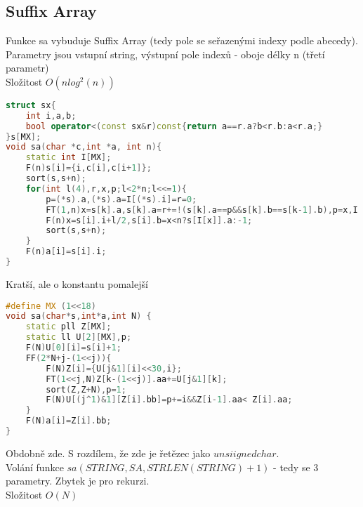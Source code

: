 \documentclass[11pt]{article}
\begin{document}
\subsection{Suffix Array}
Funkce sa vybuduje Suffix Array (tedy pole se seřazenými indexy podle abecedy).
\\Parametry jsou vstupní string, výstupní pole indexů - oboje délky \textsf{n} (třetí parametr)
\\Složitost $O(nlog^2(n))$
\begin{lstlisting}[language=C++]
struct sx{
    int i,a,b;
    bool operator<(const sx&r)const{return a==r.a?b<r.b:a<r.a;}
}s[MX];
void sa(char *c,int *a, int n){
    static int I[MX]; 
    F(n)s[i]={i,c[i],c[i+1]};
    sort(s,s+n);
    for(int l(4),r,x,p;l<2*n;l<<=1){
        p=(*s).a,(*s).a=I[(*s).i]=r=0;
        FT(1,n)x=s[k].a,s[k].a=r+=!(s[k].a==p&&s[k].b==s[k-1].b),p=x,I[s[k].i]=k;
        F(n)x=s[i].i+l/2,s[i].b=x<n?s[I[x]].a:-1;
        sort(s,s+n);
    }
    F(n)a[i]=s[i].i;
}
\end{lstlisting}
Kratší, ale o konstantu pomalejší
\begin{lstlisting}[language=C++]
#define MX (1<<18)
void sa(char*s,int*a,int N) {
    static pll Z[MX];
    static ll U[2][MX],p;
    F(N)U[0][i]=s[i]+1;
    FF(2*N+j-(1<<j)){
        F(N)Z[i]={U[j&1][i]<<30,i};
        FT(1<<j,N)Z[k-(1<<j)].aa+=U[j&1][k];
        sort(Z,Z+N),p=1;
        F(N)U[(j^1)&1][Z[i].bb]=p+=i&&Z[i-1].aa< Z[i].aa;
    }
    F(N)a[i]=Z[i].bb;
}
\end{lstlisting}
Obdobně zde. S rozdílem, že zde je řetězec jako $unsiigned char$.
\\Volání funkce $sa(STRING,SA,STRLEN(STRING)+1)$ - tedy se 3 parametry. Zbytek je pro rekurzi.
\\Složitost $O(N)$
\end{document}
